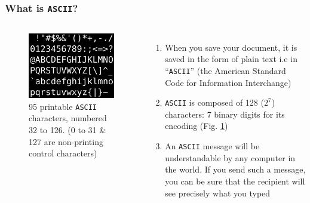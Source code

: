 \documentclass[10pt]{beamer}
\newcounter{saveenumi}
\newcommand{\seti}{\setcounter{saveenumi}{\value{enumi}}}
\begin{document}
\begin{frame}\frametitle{What is \texttt{ASCII}?}

\begin{columns}[c] %

\begin{figure}[h!]
\centering
\includegraphics[scale=0.2, keepaspectratio]{./ASCIIfull}
\caption{95 printable \texttt{ASCII} characters, numbered 32 to 126. (0 to 31 \& 127 are non-printing control characters) }
\label{fig:ascii}
\end{figure}

\begin{enumerate}
\item When you save your document, it is saved in the form of plain text i.e in ``\texttt{ASCII}'' (the American Standard Code for Information Interchange)
\item \texttt{ASCII} is composed of 128 ($2^7$) characters: 7 binary digits for its encoding (Fig. \ref{fig:ascii})
\item An \texttt{ASCII} message will be understandable by any computer in the world. If you send such a message, you can be sure that the recipient will see precisely what you typed
\seti
\end{enumerate}
\end{columns}
\end{frame} 
\end{document}
